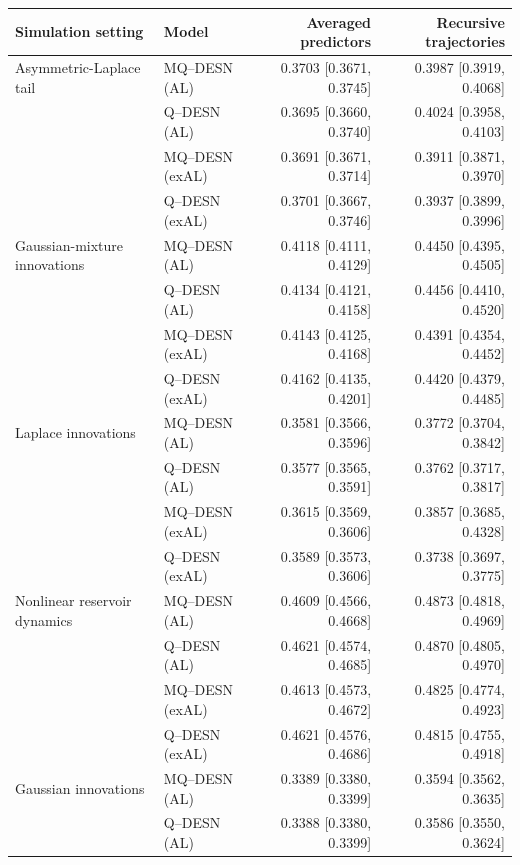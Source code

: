 \begin{table}[!htbp]
\centering
\footnotesize
\setlength{\tabcolsep}{3pt}
\renewcommand{\arraystretch}{1.08}
\begin{tabular}{@{}>{\raggedright\arraybackslash}p{}lrr@{}}
\toprule
Simulation setting & Model & Averaged predictors & Recursive trajectories \\
\midrule
Asymmetric-Laplace tail & MQ--DESN (AL) & 0.3703 [0.3671, 0.3745] & 0.3987 [0.3919, 0.4068] \\
 & Q--DESN (AL) & 0.3695 [0.3660, 0.3740] & 0.4024 [0.3958, 0.4103] \\
 & MQ--DESN (exAL) & 0.3691 [0.3671, 0.3714] & 0.3911 [0.3871, 0.3970] \\
 & Q--DESN (exAL) & 0.3701 [0.3667, 0.3746] & 0.3937 [0.3899, 0.3996] \\
\addlinespace[2pt]
Gaussian-mixture innovations & MQ--DESN (AL) & 0.4118 [0.4111, 0.4129] & 0.4450 [0.4395, 0.4505] \\
 & Q--DESN (AL) & 0.4134 [0.4121, 0.4158] & 0.4456 [0.4410, 0.4520] \\
 & MQ--DESN (exAL) & 0.4143 [0.4125, 0.4168] & 0.4391 [0.4354, 0.4452] \\
 & Q--DESN (exAL) & 0.4162 [0.4135, 0.4201] & 0.4420 [0.4379, 0.4485] \\
\addlinespace[2pt]
Laplace innovations & MQ--DESN (AL) & 0.3581 [0.3566, 0.3596] & 0.3772 [0.3704, 0.3842] \\
 & Q--DESN (AL) & 0.3577 [0.3565, 0.3591] & 0.3762 [0.3717, 0.3817] \\
 & MQ--DESN (exAL) & 0.3615 [0.3569, 0.3606] & 0.3857 [0.3685, 0.4328] \\
 & Q--DESN (exAL) & 0.3589 [0.3573, 0.3606] & 0.3738 [0.3697, 0.3775] \\
\addlinespace[2pt]
Nonlinear reservoir dynamics & MQ--DESN (AL) & 0.4609 [0.4566, 0.4668] & 0.4873 [0.4818, 0.4969] \\
 & Q--DESN (AL) & 0.4621 [0.4574, 0.4685] & 0.4870 [0.4805, 0.4970] \\
 & MQ--DESN (exAL) & 0.4613 [0.4573, 0.4672] & 0.4825 [0.4774, 0.4923] \\
 & Q--DESN (exAL) & 0.4621 [0.4576, 0.4686] & 0.4815 [0.4755, 0.4918] \\
\addlinespace[2pt]
Gaussian innovations & MQ--DESN (AL) & 0.3389 [0.3380, 0.3399] & 0.3594 [0.3562, 0.3635] \\
 & Q--DESN (AL) & 0.3388 [0.3380, 0.3399] & 0.3586 [0.3550, 0.3624] \\

\end{tabular}
\end{table}
